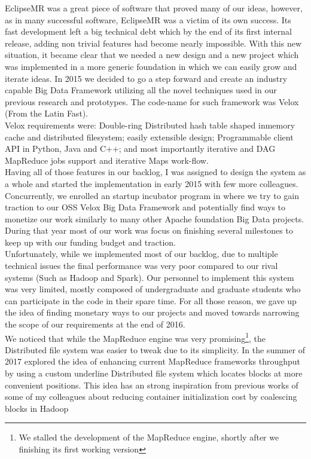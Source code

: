 EclipseMR was a great piece of software that proved many of our ideas, however, as in many successful software, EclipseMR was a victim of its own success. Its fast development left a big technical debt which by the end of its first internal release, adding non trivial features had become nearly impossible. 
With this new situation, it became clear that we needed a new design and a new project which was implemented in a more generic foundation in which we can easily grow and iterate ideas. In 2015 we decided to go a step forward and create an industry capable Big Data Framework utilizing all the novel techniques used in our previous research and prototypes. The code-name for such framework was Velox (From the Latin Fast). \\
Velox requirements were: Double-ring Distributed hash table shaped inmemory cache and distributed filesystem; easily extensible design; Programmable client API in Python, Java and C++; and most importantly iterative and DAG MapReduce jobs support and iterative Maps work-flow. \\

Having all of those features in our backlog, I was assigned to design the system as a whole and started the implementation in early 2015 with few more colleagues. Concurrently, we enrolled an startup incubator program in where we try to gain traction to our OSS Velox Big Data Framework and potentially find ways to monetize our work similarly to many other Apache foundation Big Data projects. \\
During that year most of our work was focus on finishing several milestones to keep up with our funding budget and traction. \\

Unfortunately, while we implemented most of our backlog, due to multiple technical issues the final performance was very poor compared to our rival systems (Such as Hadoop and Spark). Our personnel to implement this system was very limited, mostly composed of undergraduate and graduate students who can participate in the code in their spare time. For all those reason, we gave up the idea of finding monetary ways to our projects and moved towards narrowing the scope of our requirements at the end of 2016. \\

We noticed that while the MapReduce engine was very promising\footnote{We stalled the development of the MapReduce engine, shortly after we finishing its first working version}, the Distributed file system was easier to tweak due to its simplicity. In the summer of 2017 explored the idea of enhancing current MapReduce frameworks throughput by using a custom underline Distributed file system which locates blocks at more convenient positions. This idea has an strong inspiration from previous works of some of my colleagues about reducing container initialization cost by coalescing blocks in Hadoop\cite{kim2017coalescing}\\

